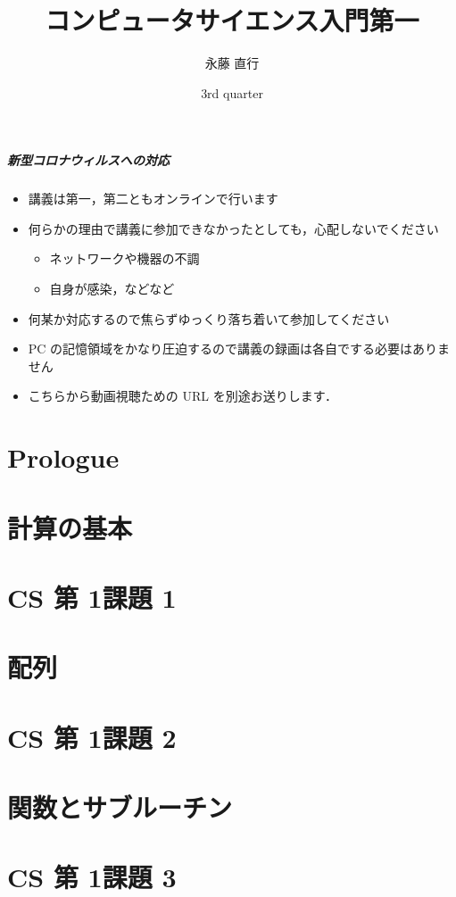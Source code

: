\documentclass[final,c]{beamer}
\title[elementaryCS-1st]{コンピュータサイエンス入門第一}
\date[3rd quarter]{3rd quarter}
\author[Naoyuki Nagatou]{永藤 直行}
\institute[TITECH]{東京工業大学}
\begin{document}
\begin{frame}
\frametitle{新型コロナウィルスへの対応}
  \begin{itemize}
\item 講義は第一，第二ともオンラインで行います
\item 何らかの理由で講義に参加できなかったとしても，心配しないでください
    \begin{itemize}
\item ネットワークや機器の不調
\item 自身が感染，などなど
    \end{itemize}
\item 何某か対応するので焦らずゆっくり落ち着いて参加してください
\item PC の記憶領域をかなり圧迫するので講義の録画は各自でする必要はありません
\item こちらから動画視聴ための URL を別途お送りします．
  \end{itemize}
\end{frame}
\frame{\titlepage}
%
%
\part{Prologue}


%
%

%
%
\part{計算の基本}

%

\part{CS 第 1\textemdash 課題 1}

%
%
\part{配列}

%
%
\part{CS 第 1\textemdash 課題 2}


\part{関数とサブルーチン}

%
%
\part{CS 第 1\textemdash 課題 3}

\end{document}
